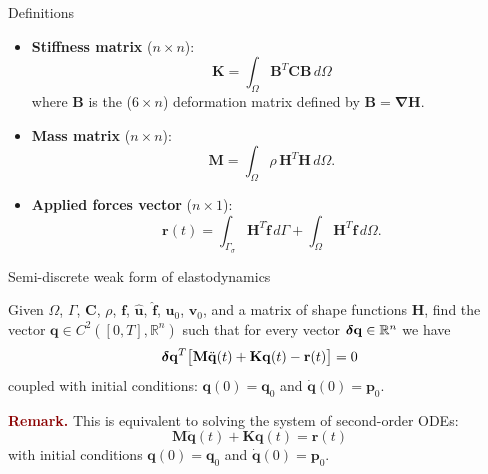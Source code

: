 \documentclass[aspectratio=169]{beamer}
\begin{document}
{

\begin{frame}{Definitions}
  \begin{block}{}
    \begin{itemize}
      \item \textbf{Stiffness matrix} ($n\times n$):
            $$\mathbf K=\int_\Omega \mathbf B^T\mathbf C\mathbf B \, d\Omega$$
            where $\mathbf B$ is the ($6\times n$) deformation matrix defined by $\mathbf B=\boldsymbol\nabla \mathbf H$.
      \item \textbf{Mass matrix} ($n\times n$):
            $$\mathbf M=\int_\Omega \rho\, \mathbf H^T\mathbf H \, d\Omega.$$
      \item \textbf{Applied forces vector} ($n\times 1$):
            $$\mathbf r(t)=\int_{\Gamma_\sigma} \mathbf H^{T}\mathbf{\hat f} \, d\Gamma+\int_{\Omega} \mathbf H^{T}\mathbf f\, d\Omega.$$
    \end{itemize}
  \end{block}
\end{frame}


\begin{frame}{Semi-discrete weak form of elastodynamics}
  \begin{block}{}Given $\Omega$, $\Gamma$, $\mathbf C$, $\rho$, $\mathbf f$, $\mathbf{\hat u}$, $\mathbf{\hat f}$, $\mathbf u_{0}$, $\mathbf v_{0}$, and a matrix of shape functions $\mathbf H$, find the vector $\mathbf q\in C^{2}([0,T],\mathbb R^{n})$ such that for every vector $\boldsymbol\delta\mathbf q\in\mathbb R^{n}$ we have
    $$\boldsymbol\delta\mathbf q^{T}\big[\mathbf M\ddot{\mathbf q}(t)+\mathbf K\mathbf q(t)-\mathbf r(t)\big]=0$$
    coupled with initial conditions: $\mathbf q(0)=\mathbf q_{0}$ and $\dot{\mathbf q}(0)=\mathbf p_{0}$.

    \vspace{0.5cm}

    \begin{tcolorbox}[colback=darkred!10,colframe=darkred!40!black,]
      \textcolor{darkred}{\textbf{Remark.}}
      This is equivalent to solving the system of second-order ODEs:
      $$\mathbf M\ddot{\mathbf q}(t)+\mathbf K\mathbf q(t)=\mathbf r(t)$$
      with initial conditions
      $\mathbf q(0)=\mathbf q_{0}$ and
      $\dot{\mathbf q}(0)=\mathbf p_{0}$.
    \end{tcolorbox}
  \end{block}
\end{frame}
}
\end{document}
